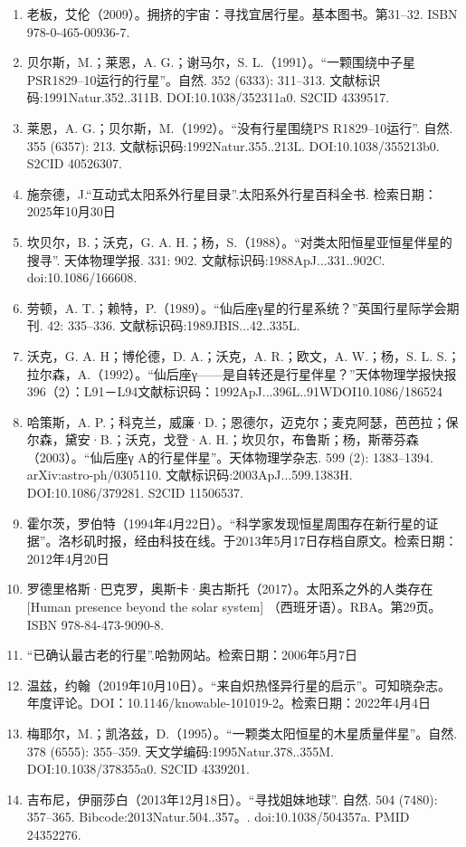 \begin{enumerate}
\item 老板，艾伦（2009）。拥挤的宇宙：寻找宜居行星。基本图书。第31–32. ISBN 978-0-465-00936-7.
\item 贝尔斯，M.；莱恩，A. G.；谢马尔，S. L.（1991）。“一颗围绕中子星PSR1829–10运行的行星”。自然. 352 (6333): 311–313. 文献标识码:1991Natur.352..311B. DOI:10.1038/352311a0. S2CID 4339517.
\item 莱恩，A. G.；贝尔斯，M.（1992）。“没有行星围绕PS R1829–10运行”. 自然. 355 (6357): 213. 文献标识码:1992Natur.355..213L. DOI:10.1038/355213b0. S2CID 40526307.
\item 施奈德，J.“互动式太阳系外行星目录”.太阳系外行星百科全书. 检索日期：2025年10月30日
\item 坎贝尔，B.；沃克，G. A. H.；杨，S.（1988）。“对类太阳恒星亚恒星伴星的搜寻”. 天体物理学报. 331: 902. 文献标识码:1988ApJ...331..902C. doi:10.1086/166608.
\item 劳顿，A. T.；赖特，P.（1989）。“仙后座γ星的行星系统？”英国行星际学会期刊. 42: 335–336. 文献标识码:1989JBIS...42..335L.
\item 沃克，G. A. H；博伦德，D. A.；沃克，A. R.；欧文，A. W.；杨，S. L. S.；拉尔森，A.（1992）。“仙后座γ——是自转还是行星伴星？”天体物理学报快报396（2）：L91－L94文献标识码：1992ApJ...396L..91WDOI10.1086/186524
\item 哈策斯，A. P.；科克兰，威廉·D.；恩德尔，迈克尔；麦克阿瑟，芭芭拉；保尔森，黛安·B.；沃克，戈登·A. H.；坎贝尔，布鲁斯；杨，斯蒂芬森（2003）。“仙后座γ A的行星伴星”。天体物理学杂志. 599 (2): 1383–1394. arXiv:astro-ph/0305110. 文献标识码:2003ApJ...599.1383H. DOI:10.1086/379281. S2CID 11506537.
\item 霍尔茨，罗伯特（1994年4月22日）。“科学家发现恒星周围存在新行星的证据”。洛杉矶时报，经由科技在线。于2013年5月17日存档自原文。检索日期：2012年4月20日
\item 罗德里格斯·巴克罗，奥斯卡·奥古斯托（2017）。太阳系之外的人类存在 [Human presence beyond the solar system] （西班牙语）。RBA。第29页。ISBN 978-84-473-9090-8.
\item “已确认最古老的行星”.哈勃网站。检索日期：2006年5月7日
\item 温兹，约翰（2019年10月10日）。“来自炽热怪异行星的启示”。可知晓杂志。年度评论。DOI：10.1146/knowable-101019-2。检索日期：2022年4月4日
\item 梅耶尔，M.；凯洛兹，D.（1995）。“一颗类太阳恒星的木星质量伴星”。自然. 378 (6555): 355–359. 天文学编码:1995Natur.378..355M. DOI:10.1038/378355a0. S2CID 4339201.
\item 吉布尼，伊丽莎白（2013年12月18日）。“寻找姐妹地球”. 自然. 504 (7480): 357–365. Bibcode:2013Natur.504..357。. doi:10.1038/504357a. PMID 24352276.

\end{enumerate}
